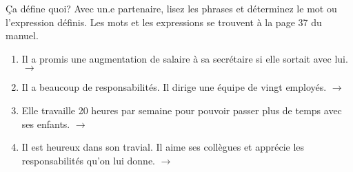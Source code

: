 \begin{frame}{Ça défine quoi?}
  Avec un.e partenaire, lisez les phrases et déterminez le mot ou l'expression définis.
  Les mots et les expressions se trouvent à la page 37 du manuel.
  \begin{enumerate}
    \item Il a promis une augmentation de salaire à sa secrétaire si elle sortait avec lui. \hfill $\to$ \underline{}
    \item Il a beaucoup de responsabilités. Il dirige une équipe de vingt employés. \hfill $\to$ \underline{}
    \item Elle travaille 20 heures par semaine pour pouvoir passer plus de temps avec ses enfants. \hfill $\to$ \underline{}
    \item Il est heureux dans son travial. Il aime ses collègues et apprécie les responsabilités qu'on lui donne. \hfill $\to$ \underline{}
  \end{enumerate}
\end{frame}